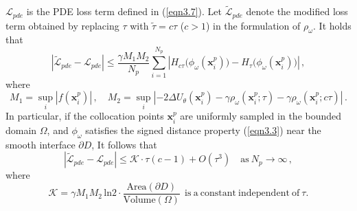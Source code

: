 \documentclass[final,hidelinks,onefignum,onetabnum]{siamart251216}
\begin{document}
\begin{proposition} \label{prop3}
$\mathcal{L}_{pde}$ is the PDE loss term defined in (\ref{eqn3.7}). Let $\tilde{\mathcal{L}}_{pde}$ denote the modified loss term obtained by replacing $\tau$ with $\tilde{\tau}=c\tau$ ($c>1$) in the formulation of $\rho_\omega$. It holds that
\begin{equation} \label{eqn3.21}
|\tilde{\mathcal{L}}_{pde}-\mathcal{L}_{pde}| \le \frac{\gamma M_1 M_2}{N_p} \sum_{i=1}^{N_p} \left| H_{c\tau}\big(\phi_\omega(\mathbf{x}_i^p)\big) - H_\tau\big(\phi_\omega(\mathbf{x}_i^p)\big) \right|\,,
\end{equation}
where
\[
M_1=\sup_i |f(\mathbf{x}_i^p)|\,,\quad M_2=\sup_i \left|-2\Delta U_{\theta}(\mathbf{x}_i^p) - \gamma \rho_{\omega}(\mathbf{x}_i^p;\tau) - \gamma \rho_{\omega}(\mathbf{x}_i^p;c\tau)\right|\,.
\]
In particular, if the collocation points $\mathbf{x}_i^p$ are uniformly sampled in the bounded domain $\Omega$, and $\phi_\omega$ satisfies the signed distance property (\ref{eqn3.3}) near the smooth interface $\partial D$, It follows that
\begin{equation}  \label{eqn3.22}
|\tilde{\mathcal{L}}_{pde} - \mathcal{L}_{pde}| \le \mathcal{K} \cdot \tau(c - 1) + O(\tau^3) \quad \mathrm{as}\ N_p\to\infty \,,
\end{equation}
where 
\[
\mathcal{K}=\gamma M_1 M_2\,\mathrm{ln}2\cdot \frac{\mathrm{Area}(\partial D)}{\mathrm{Volume}(\Omega)} \  \  \mathrm{is\ a\ constant\ independent\ of}\ \tau.
\]
\end{proposition}
\end{document}
